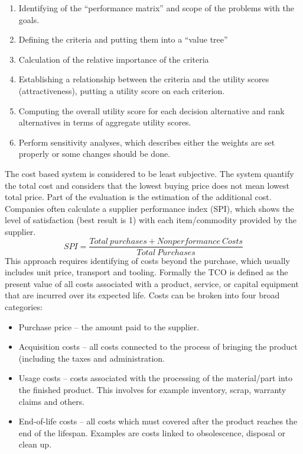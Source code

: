 \documentclass[oneside,12pt]{article}%
\begin{document}
\begin{enumerate}
  \item Identifying of the “performance matrix” and scope of the problems with the goals.
  \item Defining the criteria and putting them into a “value tree”
  \item Calculation of the relative importance of the criteria
  \item Establishing a relationship between the criteria and the utility scores (attractiveness), putting a utility score on each criterion.
  \item Computing the overall utility score for each decision alternative and rank alternatives in terms of aggregate utility scores.
  \item Perform sensitivity analyses, which describes either the weights are set properly or some changes should be done.
\end{enumerate}


The cost based system is considered to be least subjective. The system quantify the total cost and considers that the lowest buying price does not mean lowest total price. Part of the evaluation is the estimation of the additional cost. Companies often calculate a supplier performance index (SPI), which shows the level of satisfaction (best result is 1) with each item/commodity provided by the supplier.
\newline
$$SPI = \frac{Total \: purchases + Nonperformance \: Costs}{Total \: Purchases}$$
\newline
This approach requires identifying of costs beyond the purchase, which usually includes unit price, transport and tooling. Formally the TCO is defined as the present value of all costs associated with a product, service, or capital equipment that are incurred over its expected life. Costs can be broken into four broad categories:


\begin{itemize}
\item Purchase price – the amount paid to the supplier.
\item Acquisition costs – all costs connected to the process of bringing the product (including the taxes and administration.
\item Usage costs – costs associated with the processing of the material/part into the finished product. This involves for example inventory, scrap, warranty claims and others.
\item End-of-life costs – all costs which must covered after the product reaches the end of the lifespan. Examples are costs linked to obsolescence, disposal or clean up.
\end{itemize}
\end{document}
